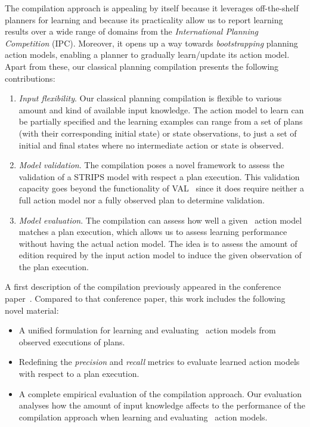 The compilation approach is appealing by itself because it leverages off-the-shelf planners for learning and because its practicality allow us to report learning results over a wide range of domains from the {\em International Planning Competition} (IPC). Moreover, it opens up a way towards \emph{bootstrapping} planning action models, enabling a planner to gradually learn/update its action model. Apart from these, our classical planning compilation presents the following contributions:
\begin{enumerate}
\item {\em Input flexibility}. Our classical planning compilation is flexible to various amount and kind of available input knowledge. The action model to learn can be partially specified and the learning examples can range from a set of plans (with their corresponding initial state) or state observations, to just a set of initial and final states where no intermediate action or state is observed. %

\item {\em Model validation}. The compilation poses a novel framework to assess the validation of a STRIPS model with respect a plan execution. This validation capacity goes beyond the functionality of VAL~\cite{howey2004val} since it does require neither a full action model nor a fully observed plan to determine validation. 
  
\item {\em Model evaluation}. The compilation can assess how well a given \strips\ action model matches a plan execution, which allows us to assess learning performance without having the actual action model. The idea is to assess the amount of edition required by the input action model to induce the given observation of the plan execution. 
\end{enumerate}

A first description of the compilation previously appeared in the conference paper~\cite{aineto2018learning}. Compared to that conference paper, this work includes the following novel material:
\begin{itemize}
\item A unified formulation for learning and evaluating \strips\ action models from observed executions of plans. 
\item Redefining the {\em precision} and {\em recall} metrics to evaluate learned action models with respect to a plan execution.
\item A complete empirical evaluation of the compilation approach. Our evaluation analyses how the amount of input knowledge affects to the performance of the compilation approach when learning and evaluating \strips\ action models.
\end{itemize}

